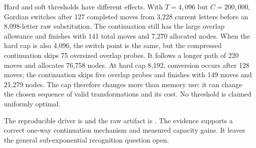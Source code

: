 Hard and soft thresholds have different effects. With $T=4{,}096$ but
$C=200{,}000$, Gordian switches after 127 completed moves from 3,228 current
letters before an 8,098-letter raw substitution. The continuation still
has the large overlap allowance and finishes with 141 total moves and
7,270 allocated nodes. When the hard cap is also 4,096, the switch point
is the same, but the compressed continuation skips 75 oversized overlap
probes. It follows a longer path of 220 moves and allocates 76,758 nodes.
At hard cap 8,192, conversion occurs after 128 moves; the continuation
skips five overlap probes and finishes with 149 moves and 21,279 nodes.
The cap therefore changes more than memory use: it can change the chosen
sequence of valid transformations and its cost. No threshold is claimed
uniformly optimal.

The reproducible driver is  and the
raw artifact is .
The evidence supports a correct one-way continuation mechanism and measured
capacity gains. It leaves the general sub-exponential recognition question
open.
